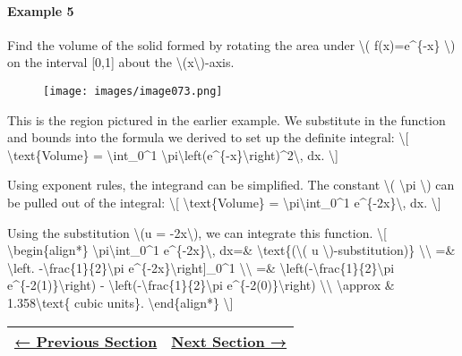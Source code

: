 \hypertarget{example-5}{%
\paragraph{Example 5}\label{example-5}}

Find the volume of the solid formed by rotating the area under
\textbackslash{}( f(x)=e\^{}\{-x\} \textbackslash{}) on the interval
{[}0,1{]} about the \textbackslash{}(x\textbackslash{})-axis.

\begin{figure}
\centering
\texttt{[image: images/image073.png]}
\caption{}
\end{figure}

This is the region pictured in the earlier example. We substitute in the
function and bounds into the formula we derived to set up the definite
integral: \textbackslash{}{[} \textbackslash{}text\{Volume\} =
\textbackslash{}int\_0\^{}1
\textbackslash{}pi\textbackslash{}left(e\^{}\{-x\}\textbackslash{}right)\^{}2\textbackslash{},
dx. \textbackslash{}{]}

Using exponent rules, the integrand can be simplified. The constant
\textbackslash{}( \textbackslash{}pi \textbackslash{}) can be pulled out
of the integral: \textbackslash{}{[} \textbackslash{}text\{Volume\} =
\textbackslash{}pi\textbackslash{}int\_0\^{}1
e\^{}\{-2x\}\textbackslash{}, dx. \textbackslash{}{]}

Using the substitution \textbackslash{}(u = -2x\textbackslash{}), we can
integrate this function. \textbackslash{}{[}
\textbackslash{}begin\{align*\}
\textbackslash{}pi\textbackslash{}int\_0\^{}1
e\^{}\{-2x\}\textbackslash{}, dx=\&
\textbackslash{}text\{(\textbackslash{}( u
\textbackslash{})-substitution)\} \textbackslash{}\textbackslash{} =\&
\textbackslash{}left. -\textbackslash{}frac\{1\}\{2\}\textbackslash{}pi
e\^{}\{-2x\}\textbackslash{}right{]}\_0\^{}1
\textbackslash{}\textbackslash{} =\&
\textbackslash{}left(-\textbackslash{}frac\{1\}\{2\}\textbackslash{}pi
e\^{}\{-2(1)\}\textbackslash{}right) -
\textbackslash{}left(-\textbackslash{}frac\{1\}\{2\}\textbackslash{}pi
e\^{}\{-2(0)\}\textbackslash{}right) \textbackslash{}\textbackslash{}
\textbackslash{}approx \& 1.358\textbackslash{}text\{ cubic units\}.
\textbackslash{}end\{align*\} \textbackslash{}{]}

\begin{longtable}[]{@{}ll@{}}
\toprule
\endhead
\href{section3-5.php}{← Previous Section} & \href{section3-7.php}{Next
Section →}\tabularnewline
\bottomrule
\end{longtable}
